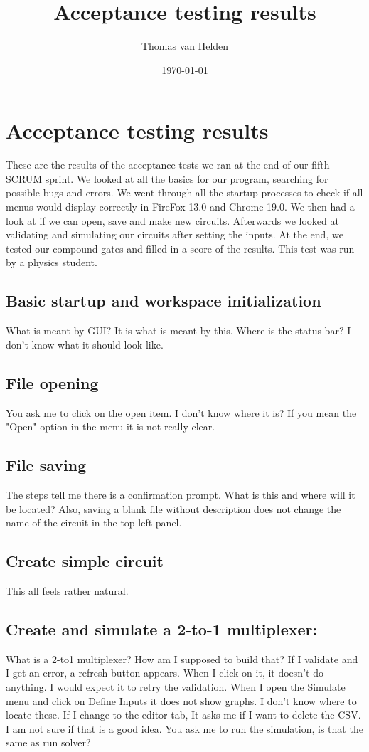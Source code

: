 \documentclass[a4paper]{article}
\newcounter{step}
\begin{document}
\title{Acceptance testing results}
\author{Thomas van Helden}
\date{\today}
\maketitle



\section{Acceptance testing results}
These are the results of the acceptance tests we ran at the end of our fifth SCRUM sprint. We looked at all the basics for our program, searching for possible bugs and errors. We went through all the startup processes to check if all menus would display correctly in FireFox 13.0 and Chrome 19.0. We then had a look at if we can open, save and make new circuits. Afterwards we looked at validating and simulating our circuits after setting the inputs. At the end, we tested our compound gates and filled in a score of the results. This test was run by a physics student.

\subsection{Basic startup and workspace initialization}
What is meant by GUI? It is what is meant by this.
Where is the status bar? I don't know what it should look like.

\subsection{File opening}
You ask me to click on the open item. I don't know where it is? If you mean the "Open" option in the menu it is not really clear. 

\subsection{File saving}
The steps tell me there is a confirmation prompt. What is this and where will it be located?
Also, saving a blank file without description does not change the name of the circuit in the top left panel.

\subsection{Create simple circuit}
This all feels rather natural.

\subsection{Create and simulate a 2-to-1 multiplexer:}
What is a 2-to1 multiplexer? How am I supposed to build that?
If I validate and I get an error, a refresh button appears. When I click on it, it doesn't do anything. I would expect it to retry the validation.
When I open the Simulate menu and click on Define Inputs it does not show graphs. I don't know where to locate these.
If I change to the editor tab, It asks me if I want to delete the CSV. I am not sure if that is a good idea.
You ask me to run the simulation, is that the same as run solver?
\end{document}
